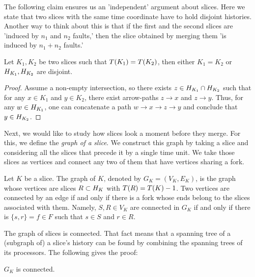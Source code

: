 The following claim ensures us an 'independent' argument about slices. Here we state that two slices with the same time coordinate have to hold disjoint histories. Another way to think about this is that if the first and the second slices are 'induced by $n_{1}$ and $n_{2}$ faults,' then the slice obtained by merging them 'is induced by $n_{1}+n_{2}$ faults.'
  \begin{claim} 
    \label{claim:disj}
    Let $K_{1}, K_{2}$ be two slices such that $T(K_1) = T(K_2)$, then either $K_{1}=K_{2}$ or $H_{K_1}, H_{K_2}$ are disjoint.
  \end{claim}
  \begin{proof}
Assume a non-empty intersection, so there exists $z \in H_{K_{1}}\cap H_{K_{2}}$ such that for any $x \in K_{1}$ and $y \in K_{2}$, there exist arrow-paths $z \rightarrow x$ and $z \rightarrow y$. Thus, for any $w \in H_{K_{1}}$, one can concatenate a path $w \rightarrow x \rightarrow z \rightarrow y$ and conclude that $y \in H_{K_{2}}$.
  \end{proof}
  

Next, we would like to study how slices look a moment before they merge. For this, we define the \textit{graph of a slice}. We construct this graph by taking a slice and considering all the slices that precede it by a single time unit. We take those slices as vertices and connect any two of them that have vertices sharing a fork.
  \begin{definition}
    \label{def:gslice}
    Let $K$ be a slice. The graph of $K$, denoted by $G_{K} = (V_{K}, E_{K})$, is the graph whose vertices are slices $R \subset H_{K}$ with $T(R) = T(K) - 1$. Two vertices are connected by an edge if and only if there is a fork whose ends belong to the slices associated with them. Namely, $S, R \in V_{K}$ are connected in $G_{K}$ if and only if there is $\{s, r\} = f \in F$ such that $s \in S$ and $r \in R$.
  \end{definition}

  
  The graph of slices is connected. That fact means that a spanning tree of a (subgraph of) a slice's history can be found by combining the spanning trees of its processors. The following gives the proof:
  \begin{claim}
    \label{claim:connected}
    $G_{K}$ is connected. 
  \end{claim}

